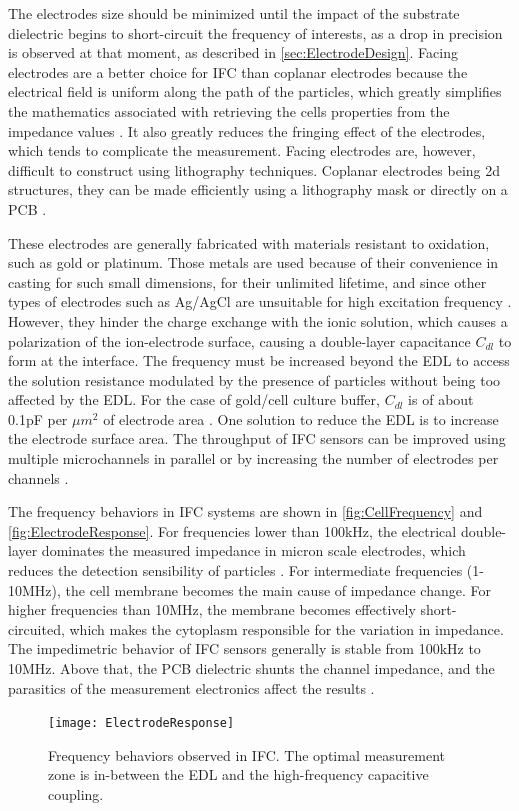 The electrodes size should be minimized until the impact of the substrate dielectric begins to short-circuit the frequency of interests, as a drop in precision is observed at that moment, as described in \autoref{sec:ElectrodeDesign}. Facing electrodes are a better choice for IFC than coplanar electrodes because the electrical field is uniform along the path of the particles, which greatly simplifies the mathematics associated with retrieving the cells properties from the impedance values \cite{Xu2016}. It also greatly reduces the fringing effect of the electrodes, which tends to complicate the measurement. Facing electrodes are, however, difficult to construct using lithography techniques. Coplanar electrodes being 2d structures, they can be made efficiently using a lithography mask or directly on a PCB \cite{Sun2010}. \par

These electrodes are generally fabricated with materials resistant to oxidation, such as gold or platinum. Those metals are used because of their convenience in casting for such small dimensions, for their unlimited lifetime, and since other types of electrodes such as Ag/AgCl are unsuitable for high excitation frequency \cite{Sun2010}. However, they hinder the charge exchange with the ionic solution, which causes a polarization of the ion-electrode surface, causing a double-layer capacitance $C_{dl}$ to form at the interface. The frequency must be increased beyond the EDL to access the solution resistance modulated by the presence of particles without being too affected by the EDL. For the case of gold/cell culture buffer, $C_{dl}$  is of about 0.1pF per $\mu m^2$ of electrode area \cite{Carminati2017}. One solution to reduce the EDL is to increase the electrode surface area. The throughput of IFC sensors can be improved using multiple microchannels in parallel or by increasing the number of electrodes per channels \cite{Sun2010}. \par

The frequency behaviors in IFC systems are shown in \autoref{fig:CellFrequency} and \autoref{fig:ElectrodeResponse}. For frequencies lower than 100kHz, the electrical double-layer dominates the measured impedance in micron scale electrodes, which reduces the detection sensibility of particles \cite{Xu2016,Gawad2004,Bouzid2022NEWCAS}. For intermediate frequencies (1-10MHz), the cell membrane becomes the main cause of impedance change. For higher frequencies than 10MHz, the membrane becomes effectively short-circuited, which makes the cytoplasm responsible for the variation in impedance. The impedimetric behavior of IFC sensors generally is stable from 100kHz to 10MHz. Above that, the PCB dielectric shunts the channel impedance, and the parasitics of the measurement electronics affect the results \cite{Gawad2004,Bouzid2022NEWCAS}. \par
\begin{figure}[h]
    \centering
    \texttt{[image: ElectrodeResponse]}
    \caption{Frequency behaviors observed in IFC. The optimal measurement zone is in-between the EDL and the high-frequency capacitive coupling. }
    \label{fig:ElectrodeResponse}
\end{figure}

